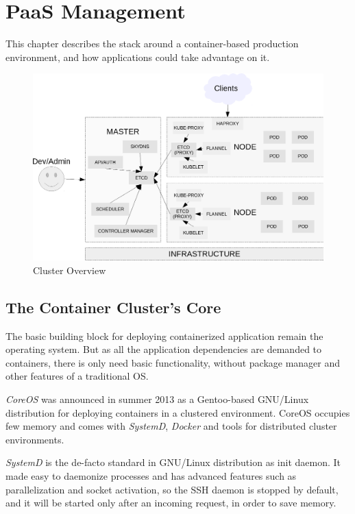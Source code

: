 \chapter{PaaS Management}\label{paas-management}

This chapter describes the stack around a container-based production
environment, and how applications could take advantage on it.

\begin{figure}[htbp]
\centering
\includegraphics{media/ch5-overview.png}
\caption{Cluster Overview}
\end{figure}

\section{The Container Cluster's
Core}\label{the-container-clusters-core}

The basic building block for deploying containerized application remain
the operating system. But as all the application dependencies are
demanded to containers, there is only need basic functionality, without
package manager and other features of a traditional OS.

\emph{CoreOS} was announced in summer 2013 as a Gentoo-based GNU/Linux
distribution for deploying containers in a clustered environment. CoreOS
occupies few memory and comes with \emph{SystemD}, \emph{Docker} and
tools for distributed cluster environments.

\emph{SystemD} is the de-facto standard in GNU/Linux distribution as
init daemon. It made easy to daemonize processes and has advanced
features such as parallelization and socket activation, so the SSH
daemon is stopped by default, and it will be started only after an
incoming request, in order to save memory.

